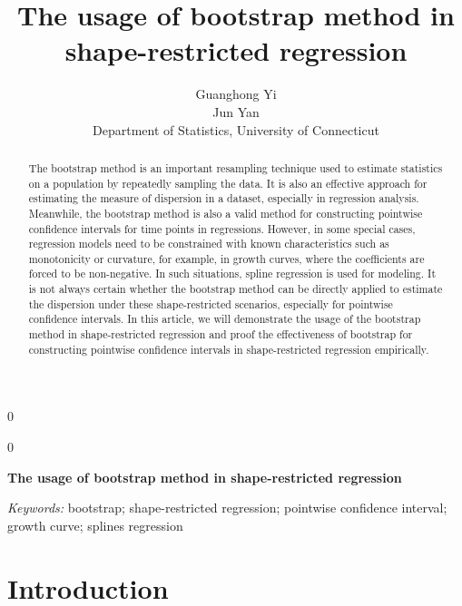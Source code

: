 \documentclass[12pt]{article}
\newcommand{\blind}{0}
\begin{document}
\def\spacingset#1{\renewcommand{\baselinestretch}%
{#1}\small\normalsize} \spacingset{1}



\blind
{
  \title{\bf The usage of bootstrap method in shape-restricted regression}
  \author{Guanghong Yi\\
  Jun Yan\\[1ex]
  Department of Statistics, University of Connecticut\\
}
  \maketitle
} \fi

\blind
{
  \bigskip
  \bigskip
  \bigskip
  \begin{center}
    {\LARGE\bf The usage of bootstrap method in shape-restricted regression}
\end{center}
  \medskip
} \fi

\bigskip
\begin{abstract}
The bootstrap method is an important resampling technique used to estimate statistics on a population by repeatedly sampling the data. It is also an effective approach for estimating the measure of dispersion in a dataset, especially in regression analysis. Meanwhile, the bootstrap method is also a valid method for constructing pointwise confidence intervals for time points in regressions. However, in some special cases, regression models need to be constrained with known characteristics such as monotonicity or curvature, for example, in growth curves, where the coefficients are forced to be non-negative. In such situations, spline regression is used for modeling. It is not always certain whether the bootstrap method can be directly applied to estimate the dispersion under these shape-restricted scenarios, especially for pointwise confidence intervals. In this article, we will demonstrate the usage of the bootstrap method in shape-restricted regression and proof the effectiveness of bootstrap for constructing pointwise confidence intervals in shape-restricted regression empirically.
\end{abstract}

\noindent%
{\it Keywords:}  bootstrap; shape-restricted regression; pointwise confidence interval; growth curve; splines regression
\vfill

\newpage
\spacingset{1.45} 
\section{Introduction}
\label{sec:intro}
\end{document}
